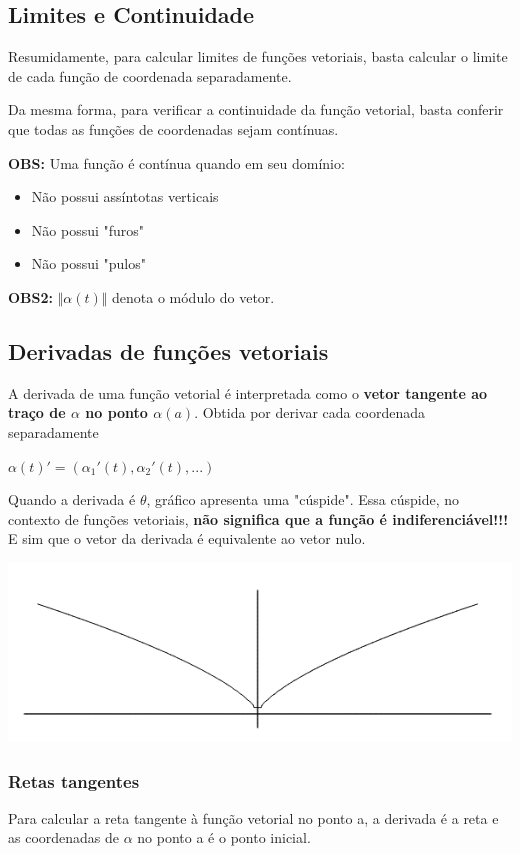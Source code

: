 \documentclass[letterpaper, 11pt]{article}
\begin{document}
\subsection{Limites e Continuidade}
\label{sec:org01c513a}
Resumidamente, para calcular limites de funções vetoriais, basta calcular o limite de cada função de coordenada separadamente.

Da mesma forma, para verificar a continuidade da função vetorial, basta conferir que todas as funções de coordenadas sejam contínuas.

\textbf{OBS:} Uma função é contínua quando em seu domínio:
\begin{itemize}
\item Não possui assíntotas verticais
\item Não possui "furos"
\item Não possui "pulos"
\end{itemize}
\textbf{OBS2:} \(\Vert \alpha (t) \Vert\) denota o módulo do vetor.
\subsection{Derivadas de funções vetoriais}
\label{sec:orge19c020}
A derivada de uma função vetorial é interpretada como o \textbf{vetor tangente ao traço de \(\alpha\) no ponto \(\alpha(a)\)}. Obtida por derivar cada coordenada separadamente

\begin{center} $\alpha(t)' = (\alpha_1'(t), \alpha_2'(t),...)$ \end{center}

Quando a derivada é \(\theta\), gráfico apresenta uma "cúspide". Essa cúspide, no contexto de funções vetoriais, \textbf{não significa que a função é indiferenciável!!!} E sim que o vetor da derivada é equivalente ao vetor nulo.
\begin{center}
\includegraphics[width=.9\linewidth]{./img/cuspide.png}
\end{center}

\subsubsection{Retas tangentes}
\label{sec:org8bfa222}
Para calcular a reta tangente à função vetorial no ponto a, a derivada é a reta e as coordenadas de \(\alpha\) no ponto a é o ponto inicial.
\end{document}
